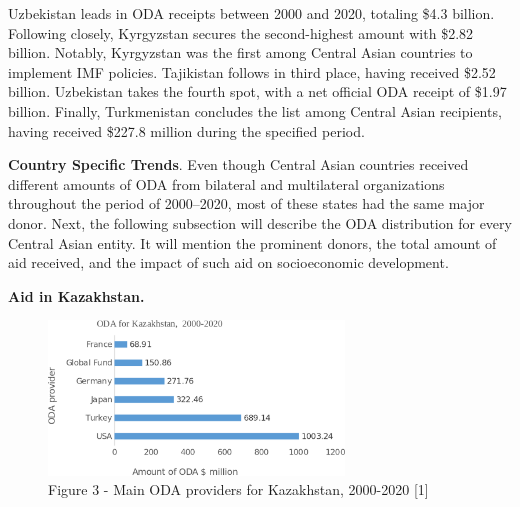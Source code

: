 \begin{multicols}{2}
Uzbekistan leads in ODA receipts between 2000 and 2020, totaling \$4.3
billion. Following closely, Kyrgyzstan secures the second-highest amount
with \$2.82 billion. Notably, Kyrgyzstan was the first among Central
Asian countries to implement IMF policies. Tajikistan follows in third
place, having received \$2.52 billion. Uzbekistan takes the fourth spot,
with a net official ODA receipt of \$1.97 billion. Finally, Turkmenistan
concludes the list among Central Asian recipients, having received
\$227.8 million during the specified period.

{\bfseries Country Specific Trends}. Even though Central Asian countries
received different amounts of ODA from bilateral and multilateral
organizations throughout the period of 2000--2020, most of these states
had the same major donor. Next, the following subsection will describe
the ODA distribution for every Central Asian entity. It will mention the
prominent donors, the total amount of aid received, and the impact of
such aid on socioeconomic development.

{\bfseries Aid in Kazakhstan.}
\end{multicols}

\begin{figure}[H]
	\centering
	\includegraphics[width=0.7\textwidth]{assets/341.2}
	\caption*{Figure 3 - Main ODA providers for Kazakhstan, 2000-2020 {[}1{]}}
\end{figure}

